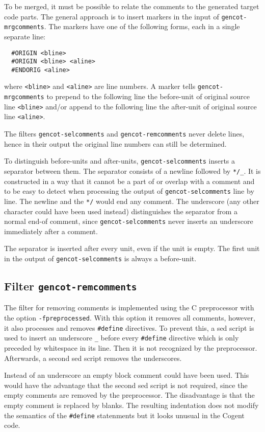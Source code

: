 \documentclass[a4paper]{report}
\newcommand{\code}[1]{\textnormal{\texttt{#1}}}
\begin{document}
To be merged, it must be possible to relate the comments to the generated target code parts. The general approach is
to insert markers in the input of \code{gencot-mrgcomments}. The markers have one of the following forms, each in 
a single separate line:
\begin{verbatim}
  #ORIGIN <bline>
  #ORIGIN <bline> <aline>
  #ENDORIG <aline>
\end{verbatim}
where \code{<bline>} and \code{<aline>} are line numbers.
A marker tells \code{gencot-mrgcomments} to prepend to the following line the before-unit of original source line \code{<bline>}
and/or append to the following line the after-unit of original source line \code{<aline>}.

The filters \code{gencot-selcomments} and \code{gencot-remcomments} never delete lines, hence in their output the original line
numbers can still be determined.

To distinguish before-units and after-units, \code{gencot-selcomments} inserts a separator between them. The separator
consists of a newline followed by \code{*/\_}. It is constructed in a way that it cannot be a part of or overlap with a 
comment and to be easy to detect when processing the output of \code{gencot-selcomments} line by line. The newline and
the \code{*/} would end any comment. The underscore (any other character could have been used instead) distinguishes the
separator from a normal end-of comment, since \code{gencot-selcomments} never inserts an underscore immediately after a comment. 

The separator is inserted after every unit, even if the unit is empty. The first unit in the output of \code{gencot-selcomments}
is always a before-unit.

\subsection{Filter \code{gencot-remcomments}}

The filter for removing comments is implemented using the C preprocessor with the option \code{-fpreprocessed}. With this
option it removes all comments, however, it also processes and removes \code{\#define} directives. To prevent this, a sed
script is used to insert an underscore \code{\_} before every \code{\#define} directive which is only preceded 
by whitespace in its line. Then it is not recognized by the preprocessor. Afterwards, a second sed script removes the underscores.

Instead of an underscore an empty block comment could have been used. This would have the advantage that the second sed script
is not required, since the empty comments are removed by the preprocessor. The disadvantage is that the empty comment
is replaced by blanks. The resulting indentation does not modify the semantics of the \code{\#define} statenments but it
looks unusual in the Cogent code.
\end{document}
